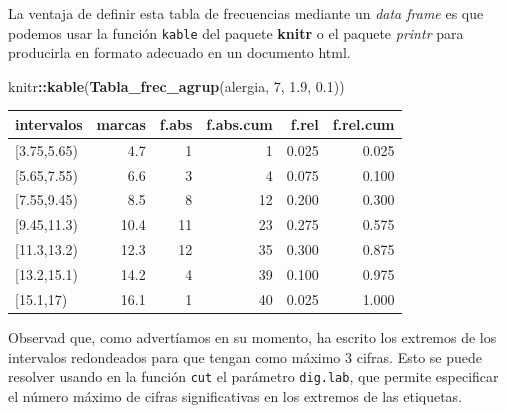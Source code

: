 \documentclass[
]{book}
\newenvironment{Shaded}{\begin{snugshade}}{\end{snugshade}}
\newcommand{\DecValTok}[1]{\textcolor[rgb]{0.00,0.00,0.81}{#1}}
\newcommand{\FloatTok}[1]{\textcolor[rgb]{0.00,0.00,0.81}{#1}}
\newcommand{\KeywordTok}[1]{\textcolor[rgb]{0.13,0.29,0.53}{\textbf{#1}}}
\newcommand{\NormalTok}[1]{#1}
\newcommand{\OperatorTok}[1]{\textcolor[rgb]{0.81,0.36,0.00}{\textbf{#1}}}
\theoremstyle{definition}
\theoremstyle{definition}
\theoremstyle{definition}
\theoremstyle{remark}
\begin{document}
La ventaja de definir esta tabla de frecuencias mediante un \emph{data frame} es que podemos usar la función \texttt{kable} del paquete \textbf{knitr} o el paquete \emph{printr} para producirla en formato adecuado en un documento html.

\begin{Shaded}
\begin{Highlighting}[]
\NormalTok{knitr}\OperatorTok{::}\KeywordTok{kable}\NormalTok{(}\KeywordTok{Tabla\_frec\_agrup}\NormalTok{(alergia, }\DecValTok{7}\NormalTok{, }\FloatTok{1.9}\NormalTok{, }\FloatTok{0.1}\NormalTok{))}
\end{Highlighting}
\end{Shaded}

\begin{tabular}{l|r|r|r|r|r}
\hline
intervalos & marcas & f.abs & f.abs.cum & f.rel & f.rel.cum\\
\hline
[3.75,5.65) & 4.7 & 1 & 1 & 0.025 & 0.025\\
\hline
[5.65,7.55) & 6.6 & 3 & 4 & 0.075 & 0.100\\
\hline
[7.55,9.45) & 8.5 & 8 & 12 & 0.200 & 0.300\\
\hline
[9.45,11.3) & 10.4 & 11 & 23 & 0.275 & 0.575\\
\hline
[11.3,13.2) & 12.3 & 12 & 35 & 0.300 & 0.875\\
\hline
[13.2,15.1) & 14.2 & 4 & 39 & 0.100 & 0.975\\
\hline
[15.1,17) & 16.1 & 1 & 40 & 0.025 & 1.000\\
\hline
\end{tabular}

Observad que, como advertíamos en su momento, ha escrito los extremos de los intervalos redondeados para que tengan como máximo 3 cifras. Esto se puede resolver usando en la función \texttt{cut} el parámetro \texttt{dig.lab}, que permite especificar el número máximo de cifras significativas en los extremos de las etiquetas.
\end{document}
